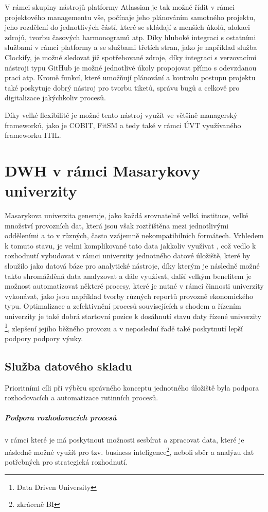 \documentclass[
  digital,     %
  twoside,     %
  lof,         %
  lot,         %
]{fithesis4}
\begin{document}
V rámci skupiny nástrojů platformy Atlassian je tak možné řídit v rámci projektového managementu vše, počínaje jeho plánováním samotného projektu, jeho rozdělení do jednotlivých částí, které se skládají z menších úkolů, alokaci zdrojů, tvorbu časových harmonogramů atp. Díky hluboké integraci s ostatními službami v rámci platformy a se službami třetích stran, jako je například služba Clockify, je možné sledovat již spotřebované zdroje, díky integraci s verzovacími nástroji typu GitHub je možné jednotlivé úkoly propojovat přímo s odevzdanou prací atp. Kromě funkcí, které umožňují plánování a kontrolu postupu projektu také poskytuje dobrý nástroj pro tvorbu tiketů, správu bugů a celkově pro digitalizace jakýchkoliv procesů.  

Díky velké flexibilitě je možné tento nástroj využít ve většině managerský frameworků, jako je COBIT, FitSM a tedy také v rámci ÚVT využívaného frameworku ITIL.

\chapter{DWH v rámci Masarykovy univerzity}
Masarykova univerzita generuje, jako každá srovnatelně velká instituce, velké množství provozních dat, která jsou však roztříštěna mezi jednotlivými odděleními a to v různých, často vzájemně nekompatibilních formátech. Vzhledem k tomuto stavu, je velmi komplikované tato data jakkoliv využívat , což vedlo k rozhodnutí  vybudovat v rámci univerzity jednotného datové úložiště, které by sloužilo jako datová báze pro analytické nástroje, díky kterým je následně možné takto shromážděná data analyzovat a dále využívat, další velkým benefitem je možnost automatizovat některé procesy, které je nutné v rámci činnosti univerzity vykonávat, jako jsou například tvorby různých reportů provozně ekonomického typu. Optimalizace a zefektivnění procesů souvisejících s chodem a řízením univerzity je také dobrá startovní pozice k dosáhnutí stavu daty řízené univerzity \footnote{Data Driven University}, zlepšení jejího běžného provozu a v neposlední řadě také poskytnutí lepší podpory podpory výuky.

\section{Služba datového skladu}
Prioritními cíli při výběru správného konceptu jednotného úložiště byla podpora rozhodovacích a automatizace rutinních procesů. 
\paragraph{Podpora rozhodovacích procesů} v rámci které je má poskytnout možnosti sesbírat a zpracovat data, které je následně možné využít pro tzv. business inteligence\footnote{zkráceně BI}, neboli sběr a analýzu dat potřebných pro strategická rozhodnutí.
\end{document}
